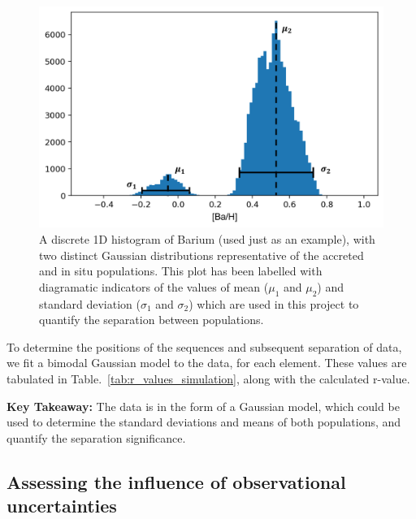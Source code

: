 \documentclass[fleqn,usenatbib]{mnras}
\newcommand{\SB}[1]{{\textcolor{orange}{SB: #1}}}
\begin{document}
\begin{figure}
	\includegraphics[width=\columnwidth]{figures/hist_labelled.png}
    \caption{A discrete 1D histogram of Barium (used just as an example), with two distinct Gaussian distributions representative of the accreted and in situ populations. This plot has been labelled with diagramatic indicators of the values of mean ($\mu_1$ and $\mu_2$) and standard deviation ($\sigma_1$ and $\sigma_2$) which are used in this project to quantify the separation between populations.}
    \label{fig:hist_labels}
\end{figure}

To determine the positions of the sequences and subsequent separation of data, we fit a bimodal Gaussian model to the data, for each element. These values are tabulated in Table.~\ref{tab:r_values_simulation}, along with the calculated r-value.\par 

\textbf{Key Takeaway:} The data is in the form of a Gaussian model, which could be used to determine the standard deviations and means of both populations, and quantify the separation significance. 




\subsection{Assessing the influence of observational uncertainties}
\end{document}
